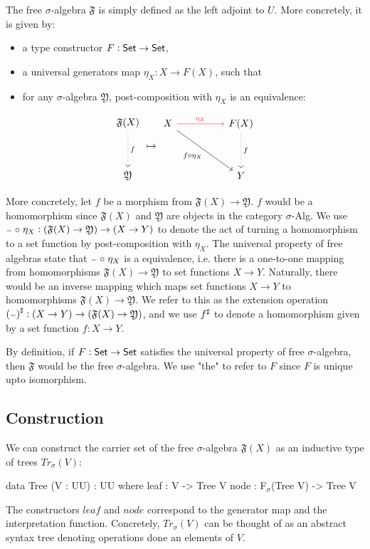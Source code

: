 The free $\sigma$-algebra $\mathfrak{F}$ is simply defined as the left adjoint to $U$.
More concretely, it is given by:
\begin{itemize}
    \item a type constructor $F : \mathsf{Set} \to \mathsf{Set}$,
    \item a universal generators map $\eta_X : X \to F(X)$, such that
    \item for any $\sigma$-algebra $\mathfrak{Y}$, post-composition with $\eta_X$ is an equivalence:
\end{itemize}
\[
\begin{tikzcd}[ampersand replacement=\&]
	\mathfrak{F}(X) \\
	\\
	\mathfrak{Y}
	\arrow["f", dotted, from=1-1, to=3-1]
\end{tikzcd}
\mapsto
\begin{tikzcd}[ampersand replacement=\&]
	X \&\& {F(X)} \\
	\\
	\&\& {Y}
	\arrow["\eta_X", color={rgb,255:red,255;green,54;blue,51}, from=1-1, to=1-3]
	\arrow["f \comp \eta_X"', from=1-1, to=3-3]
	\arrow["{f}", dotted, from=1-3, to=3-3]
\end{tikzcd}\]

More concretely, let $f$ be a morphism from $\mathfrak{F}(X) \to \mathfrak{Y}$.
$f$ would be a homomorphism since $\mathfrak{F}(X)$ and $\mathfrak{Y}$ are
objects in the category $\sigma$-Alg. 
We use
${\scriptstyle{-}} \mathrel{\circ} \eta_X : (\mathfrak{F}(X) \to \mathfrak{Y}) \to (X \to Y)$
to denote the act of turning a homomorphism to a set function by
post-composition with $\eta_X$.
The universal property of free algebras state that ${\scriptstyle{-}} \mathrel{\circ} \eta_X$
is a equivalence, i.e. there is a one-to-one mapping from
homomorphisms $\mathfrak{F}(X) \to \mathfrak{Y}$ to set functions $X \to Y$.
Naturally, there would be an inverse mapping which maps set functions $X \to Y$
to homomorphisms $\mathfrak{F}(X) \to \mathfrak{Y}$. We refer to this
as the extension operation ${({\scriptstyle{-}})}^{\sharp} : (X \to Y) \to (\mathfrak{F}(X) \to \mathfrak{Y})$,
and we use ${f}^{\sharp}$ to denote a homomorphism given by a set function $f : X \to Y$.

By definition, if $F : \mathsf{Set} \to \mathsf{Set}$ satisfies the universal property of
free $\sigma$-algebra, then $\mathfrak{F}$ would be the free $\sigma$-algebra.
We use "the" to refer to $F$ since $F$ is unique upto isomorphism. 

\subsection{Construction}
We can construct the carrier set of the free $\sigma$-algebra
$\mathfrak{F}(X)$ as an inductive type of trees $Tr_\sigma(V)$:
\begin{code}
data Tree (V : UU) : UU where
    leaf : V -> Tree V
    node : F$_\sigma$(Tree V) -> Tree V
\end{code}

The constructors $leaf$ and $node$ correspond to the generator map
and the interpretation function. Concretely, $Tr_\sigma(V)$ can
be thought of as an abstract syntax tree denoting operations done
an elements of $V$. 
